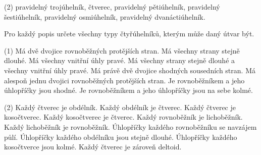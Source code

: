 \documentclass[12pt,a4paper]{article}
\begin{document}
\begin{exercise}

    \begin{tasks}(2)
        \task pravidelný trojúhelník,
        \task čtverec,
        \task pravidelný pětiúhelník,
        \task pravidelný šestiúhelník,
        \task pravidelný osmiúhelník,
        \task pravidelný dvanáctiúhelník.
    \end{tasks}

\end{exercise}



\setcounter{section}{4}


\begin{exercise}

    Pro každý popis určete všechny typy čtyřúhelníků, kterým může daný útvar být.

    \begin{tasks}(1)
        \task Má dvě dvojice rovnoběžných protějších stran.
        \task Má všechny strany stejně dlouhé.
        \task Má všechny vnitřní úhly pravé.
        \task Má všechny strany stejně dlouhé a všechny vnitřní úhly pravé.
        \task Má právě dvě dvojice shodných sousedních stran.
        \task Má alespoň jednu dvojici rovnoběžných protějších stran.
        \task Je rovnoběžníkem a jeho úhlopříčky jsou shodné.
        \task Je rovnoběžníkem a jeho úhlopříčky jsou na sebe kolmé.
    \end{tasks}

\end{exercise}



\begin{exercise}

    \begin{tasks}(2)
        \task Každý čtverec je obdélník.
        \task Každý obdélník je čtverec.
        \task Každý čtverec je kosočtverec.
        \task Každý kosočtverec je čtverec.
        \task Každý rovnoběžník je lichoběžník.
        \task Každý lichoběžník je rovnoběžník.
        \task Úhlopříčky každého rovnoběžníku se navzájem půlí.
        \task Úhlopříčky každého obdélníku jsou stejně dlouhé.
        \task Úhlopříčky každého kosočtverce jsou kolmé.
        \task Každý čtverec je zároveň deltoid.
    \end{tasks}

\end{exercise}
\end{document}
